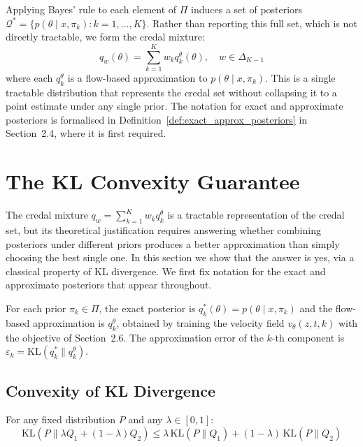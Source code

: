     Applying Bayes' rule to each element of $\Pi$ induces a set of posteriors $\mathcal{Q}^* = \{ p(\theta \mid x, \pi_k) : k = 1, \ldots, K \}$. Rather than reporting this full set, which is not directly tractable, we form the credal mixture:
    \begin{equation}
        q_w(\theta) = \sum_{k=1}^K w_k q^\theta_k(\theta), \quad w \in \Delta_{K-1}
    \end{equation}
    where each $q^\theta_k$ is a flow-based approximation to $p(\theta \mid x, \pi_k)$. This is a single tractable distribution that represents the credal set without collapsing it to a point estimate under any single prior. The notation for exact and approximate posteriors is formalised in Definition~\ref{def:exact_approx_posteriors} in Section~2.4, where it is first required.

    \section{The KL Convexity Guarantee}

    The credal mixture $q_w = \sum_{k=1}^K w_k q^\theta_k$ is a tractable representation of the credal set, but its theoretical justification requires answering whether combining posteriors under different priors produces a better approximation than simply choosing the best single one. In this section we show that the answer is yes, via a classical property of KL divergence. We first fix notation for the exact and approximate posteriors that appear throughout.

    \begin{definition}
    \label{def:exact_approx_posteriors}
    For each prior $\pi_k \in \Pi$, the exact posterior is $q^*_k(\theta) = p(\theta \mid x, \pi_k)$ and the flow-based approximation is $q^\theta_k$, obtained by training the velocity field $v_\theta(z, t, k)$ with the objective of Section~2.6. The approximation error of the $k$-th component is $\varepsilon_k = \mathrm{KL}(q^*_k \| q^\theta_k)$.
    \end{definition}

    \subsection{Convexity of KL Divergence}

    \begin{lemma} 
    \label{lem:kl_convexity_ch2}
    For any fixed distribution $P$ and any $\lambda \in [0,1]$:
    \begin{equation}
        \mathrm{KL}(P \| \lambda Q_1 + (1-\lambda) Q_2) \leq \lambda\, \mathrm{KL}(P \| Q_1) + (1-\lambda)\, \mathrm{KL}(P \| Q_2)
    \end{equation}
    \end{lemma}

